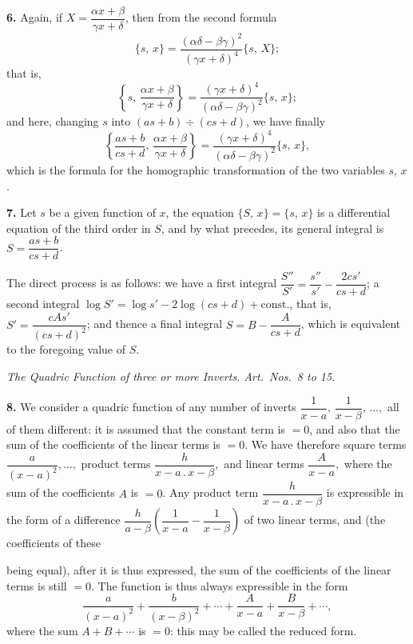 \documentclass[11pt]{article}
\newcommand{\artno}[1]{\textbf{#1.}\quad}
\begin{document}
\artno{6} Again, if $X = \dfrac{\alpha x+\beta}{\gamma x+\delta}$, then from the second formula
\[
   \{s,\,x\} = \frac{(\alpha\delta - \beta\gamma)^{2}}{(\gamma x+\delta)^{4}}\{s,\,X\};
\]
that is,
\[
   \left\{s,\,\frac{\alpha x+\beta}{\gamma x+\delta}\right\} = \frac{(\gamma x+\delta)^{4}}{(\alpha\delta - \beta\gamma)^{2}}\{s,\,x\};
\]
and here, changing $s$ into $(as+b) \div (cs+d)$, we have finally
\[
   \left\{\frac{as+b}{cs+d},\,\frac{\alpha x+\beta}{\gamma x+\delta}\right\} = \frac{(\gamma x+\delta)^{4}}{(\alpha\delta - \beta\gamma)^{2}}\{s,\,x\},
\]
which is the formula for the homographic transformation of the two variables $s$, $x$.

\artno{7} Let $s$ be a given function of $x$, the equation $\{S,\,x\} = \{s,\,x\}$ is a differential
equation of the third order in $S$, and by what precedes, its general integral is $S = \dfrac{as+b}{cs+d}$.

The direct process is as follows: we have a first integral $\dfrac{S''}{S'} = \dfrac{s''}{s'} - \dfrac{2cs'}{cs+d}$; a second
integral $\log S' = \log s' - 2\log(cs+d) + \mathrm{const.}$, that is, $S' = \dfrac{cAs'}{(cs+d)^{2}}$; and thence a final
integral $S = B - \dfrac{A}{cs+d}$, which is equivalent to the foregoing value of $S$.

\bigskip

\begin{center}
\textit{The Quadric Function of three or more Inverts. Art.\ Nos.\ 8 to 15.}
\end{center}

\medskip

\artno{8} We consider a quadric function of any number of inverts $\dfrac{1}{x-a},\, \dfrac{1}{x-\beta},\, \ldots,$ all
of them different: it is assumed that the constant term is $=0$, and also that the
sum of the coefficients of the linear terms is $=0$. We have therefore square terms
$\dfrac{a}{(x-a)^{2}}, \ldots,$ product terms $\dfrac{h}{x-a \,.\, x-\beta},$ and linear terms $\dfrac{A}{x-a},$ where the
sum of the coefficients $A$ is $=0$. Any product term $\dfrac{h}{x-a \,.\, x-\beta}$ is expressible in the form of a
difference $\dfrac{h}{a-\beta}\!\left(\dfrac{1}{x-a} - \dfrac{1}{x-\beta}\right)$ of two linear terms, and (the coefficients of these

\newpage
being equal), after it is thus expressed, the sum of the coefficients of the linear terms
is still $=0$. The function is thus always expressible in the form
\[
   \frac{a}{(x-a)^{2}} + \frac{b}{(x-\beta)^{2}} + \cdots + \frac{A}{x-a} + \frac{B}{x-\beta} + \cdots,
\]
where the sum $A + B + \cdots$ is $=0$: this may be called the reduced form.
\end{document}
